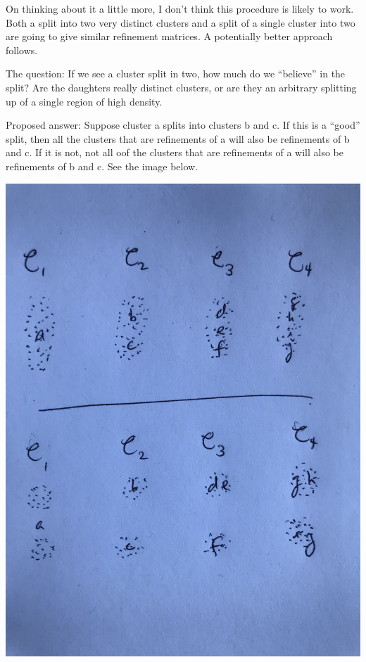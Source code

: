 \documentclass[11pt]{article}
\begin{document}
On thinking about it a little more, I don't think this procedure is likely to work.
Both a split into two very distinct clusters and a split of a single cluster into two are going to give similar refinement matrices.
A potentially better approach follows.

The question: If we see a cluster split in two, how much do we ``believe'' in the split?
Are the daughters really distinct clusters, or are they an arbitrary splitting up of a single region of high density.

Proposed answer: Suppose cluster a splits into clusters b and c.
If this is a ``good'' split, then all the clusters that are refinements of a will also be refinements of b and c.
If it is not, not all oof the clusters that are refinements of a will also be refinements of b and c.
See the image below.

\includegraphics[width=.8\textwidth]{good-bad-split}
\end{document}
